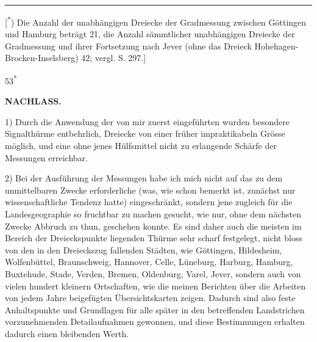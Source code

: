 \par\smallskip\noindent\rule{.24\linewidth}{.4pt}\par\smallskip
{\footnotesize\noindent\hspace*{\parindent}[\textsuperscript{*}) Die Anzahl der unabhängigen Dreiecke der Gradmessung zwischen Göttingen und Hamburg beträgt 21, die Anzahl sämmtlicher unabhängigen Dreiecke der Gradmessung und ihrer Fortsetzung nach Jever (ohne das Dreieck Hohehagen-Brocken-Inselsberg) 42; vergl. S. 297.]\par}

\par\smallskip\noindent\hfill{\footnotesize 53\textsuperscript{*}}\hspace*{.12\linewidth}\par

\par\clearpage
\noindent{}\hfill{\small\textbf{NACHLASS.}}\hfill\null\par\medskip

\par\noindent\hspace*{\parindent}1) Durch die Anwendung der von mir zuerst eingeführten  wurden besondere Signalthürme entbehrlich, Dreiecke von einer früher impraktikabeln Grösse möglich, und eine ohne jenes Hülfsmittel nicht zu erlangende Schärfe der Messungen erreichbar.

\par\noindent\hspace*{\parindent}2) Bei der Ausführung der Messungen habe ich mich nicht auf das zu dem unmittelbaren Zwecke erforderliche (was, wie schon bemerkt ist, zunächst nur wissenschaftliche Tendenz hatte) eingeschränkt, sondern jene zugleich für die Landesgeographie so fruchtbar zu machen gesucht, wie nur, ohne dem nächsten Zwecke Abbruch zu thun, geschehen konnte. Es sind daher auch die meisten im Bereich der Dreieckspunkte liegenden Thürme sehr scharf festgelegt, nicht bloss von den in den Dreieckszug fallenden Städten, wie Göttingen, Hildesheim, Wolfenbüttel, Braunschweig, Hannover, Celle, Lüneburg, Harburg, Hamburg, Buxtehude, Stade, Verden, Bremen, Oldenburg, Varel, Jever, sondern auch von vielen hundert kleinern Ortschaften, wie die meinen Berichten über die Arbeiten von jedem Jahre beigefügten Übersichtskarten zeigen. Dadurch sind also feste Anhaltspunkte und Grundlagen für alle später in den betreffenden Landstrichen vorzunehmenden Detailaufnahmen gewonnen, und diese Bestimmungen erhalten dadurch einen bleibenden Werth.

